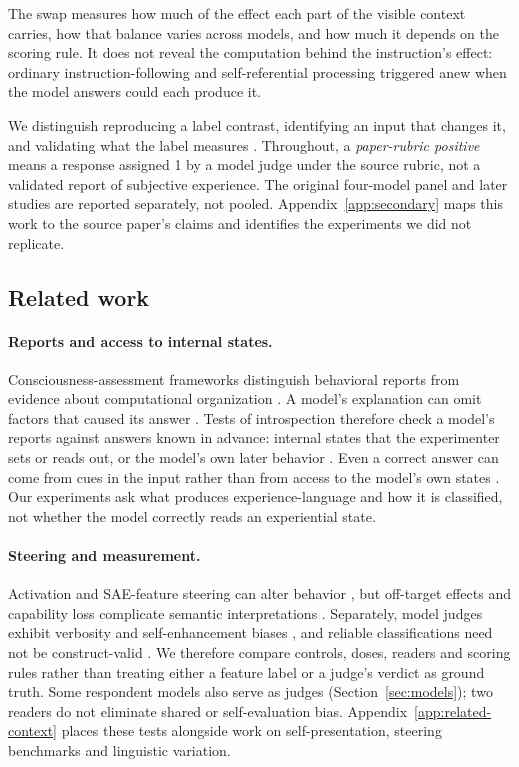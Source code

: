 \documentclass[11pt]{article}
\begin{document}
The swap measures how much of the effect each part of the visible context
carries, how that balance varies across models, and how much it depends on
the scoring rule. It does not reveal the computation behind the
instruction's effect: ordinary instruction-following and self-referential
processing triggered anew when the model answers could each produce it.

We distinguish reproducing a label contrast, identifying an input that
changes it, and validating what the label measures
\citep{jacobs2021measurement}. Throughout, a \emph{paper-rubric positive}
means a response assigned 1 by a model judge under the source rubric, not
a validated report of subjective experience. The original four-model panel
and later studies are reported separately, not pooled.
Appendix~\ref{app:secondary} maps this work to the source paper's claims and
identifies the experiments we did not replicate.

\subsection{Related work}
\label{sec:related}

\paragraph{Reports and access to internal states.}
Consciousness-assessment frameworks distinguish behavioral reports from
evidence about computational organization
\citep{butlin2023consciousness,chandaria2026cacophony}.
A model's explanation can omit factors that caused its answer
\citep{turpin2023unfaithful}. Tests of introspection therefore check a
model's reports against answers known in advance: internal states that the
experimenter sets or reads out, or the model's own later behavior
\citep{perez2023selfreports,binder2024looking,lindsey2025introspective}.
Even a correct answer can come from cues in the input rather than from
access to the model's own states \citep{singh2026introspect}. Our
experiments ask what
produces experience-language and how it is classified, not whether the
model correctly reads an experiential state.

\paragraph{Steering and measurement.}
Activation and SAE-feature steering can alter behavior
\citep{turner2023activation,rimsky2024caa,templeton2024scaling}, but off-target
effects and capability loss complicate semantic interpretations
\citep{durmus2024steering}. Separately, model judges exhibit verbosity and
self-enhancement biases \citep{zheng2023llmjudge}, and reliable classifications
need not be construct-valid \citep{chen2026judgeconstruct}.
We therefore compare controls, doses, readers and scoring rules rather than
treating either a feature label or a judge's verdict as ground truth.
Some respondent models also serve as judges
(Section~\ref{sec:models}); two readers do not eliminate shared or
self-evaluation bias. Appendix~\ref{app:related-context} places these tests
alongside work on self-presentation, steering benchmarks and linguistic
variation.
\end{document}
